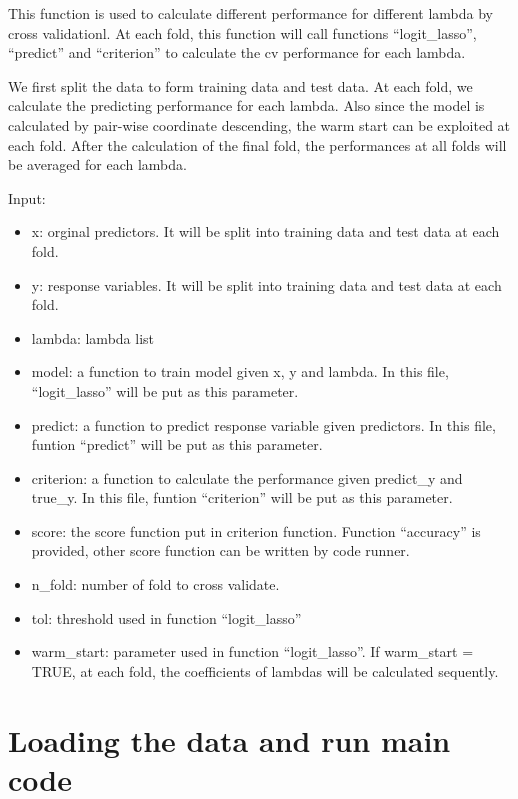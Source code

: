 \documentclass[
]{article}
\begin{document}
This function is used to calculate different performance for different
lambda by cross validationl. At each fold, this function will call
functions ``logit\_lasso'', ``predict'' and ``criterion'' to calculate
the cv performance for each lambda.

We first split the data to form training data and test data. At each
fold, we calculate the predicting performance for each lambda. Also
since the model is calculated by pair-wise coordinate descending, the
warm start can be exploited at each fold. After the calculation of the
final fold, the performances at all folds will be averaged for each
lambda.

Input:

\begin{itemize}
\item
  x: orginal predictors. It will be split into training data and test
  data at each fold.
\item
  y: response variables. It will be split into training data and test
  data at each fold.
\item
  lambda: lambda list
\item
  model: a function to train model given x, y and lambda. In this file,
  ``logit\_lasso'' will be put as this parameter.
\item
  predict: a function to predict response variable given predictors. In
  this file, funtion ``predict'' will be put as this parameter.
\item
  criterion: a function to calculate the performance given predict\_y
  and true\_y. In this file, funtion ``criterion'' will be put as this
  parameter.
\item
  score: the score function put in criterion function. Function
  ``accuracy'' is provided, other score function can be written by code
  runner.
\item
  n\_fold: number of fold to cross validate.
\item
  tol: threshold used in function ``logit\_lasso''
\item
  warm\_start: parameter used in function ``logit\_lasso''. If
  warm\_start = TRUE, at each fold, the coefficients of lambdas will be
  calculated sequently.
\end{itemize}

\hypertarget{loading-the-data-and-run-main-code}{%
\section{Loading the data and run main
code}\label{loading-the-data-and-run-main-code}}
\end{document}

